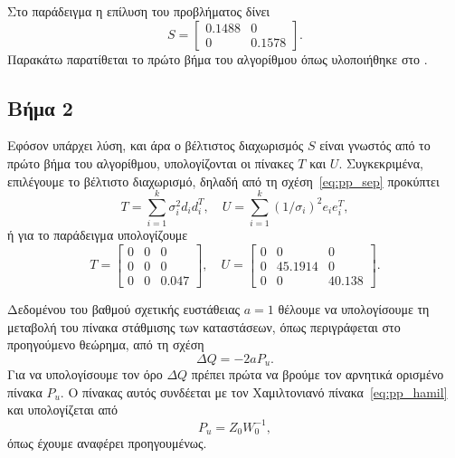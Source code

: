 Στο παράδειγμα η επίλυση του προβλήματος  δίνει
\begin{equation*}
    S =
    \begin{bmatrix}
        0.1488 & 0 \\
        0 & 0.1578
    \end{bmatrix}.
\end{equation*}
Παρακάτω παρατίθεται το πρώτο βήμα του αλγορίθμου όπως υλοποιήθηκε στο
.
\eng{}

\subsection{Βήμα 2}
Εφόσον υπάρχει λύση, και άρα ο βέλτιστος διαχωρισμός \( S \) είναι γνωστός από
το πρώτο βήμα του αλγορίθμου, υπολογίζονται οι πίνακες \( T \) και \( U \).
Συγκεκριμένα, επιλέγουμε το βέλτιστο διαχωρισμό, δηλαδή από τη
σχέση~\eqref{eq:pp_sep} προκύπτει
\begin{equation}\label{eq:pp_t_u_new}
    T = \sum_{i = 1}^k \sigma_i^2 d_id_i^T, \quad
    U = \sum_{i = 1}^k (1/\sigma_i)^2 e_ie_i^T,
\end{equation}
ή για το παράδειγμα υπολογίζουμε
\[
    T =
    \begin{bmatrix}
        0 & 0 & 0 \\
        0 & 0 & 0 \\
        0 & 0 & 0.047
    \end{bmatrix}, \quad
    U =
    \begin{bmatrix}
        0 & 0 & 0 \\
        0 & 45.1914 & 0 \\
        0 & 0 & 40.138
    \end{bmatrix}.
\]

Δεδομένου του βαθμού σχετικής ευστάθειας \( a = 1 \) θέλουμε να υπολογίσουμε τη
μεταβολή του πίνακα στάθμισης των καταστάσεων, όπως περιγράφεται στο
προηγούμενο θεώρημα, από τη σχέση
\[
    \Delta Q = -2aP_u.
\]
Για να υπολογίσουμε τον όρο \( \Delta Q \) πρέπει πρώτα να βρούμε τον αρνητικά
ορισμένο πίνακα \( P_u \). Ο πίνακας αυτός συνδέεται με τον Χαμιλτονιανό
πίνακα~\eqref{eq:pp_hamil} και υπολογίζεται από
\begin{equation}\label{eq:pp_pu}
    P_u = Z_0 W_0^{-1},
\end{equation}
όπως έχουμε αναφέρει προηγουμένως.

